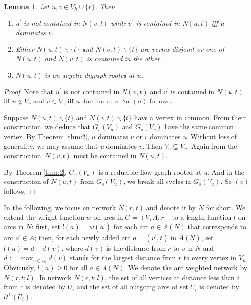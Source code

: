 \documentclass[11pt]{article}
\newtheorem{lemma}[theorem]{Lemma}
\begin{document}
\begin{lemma}
\label{lem:1}
Let $u,v\in V_h\cup\{r\}$. Then
\begin{enumerate}[label=\emph{(}\alph*\emph{)}]
  \item $u^\prime$ is not contained in $N(v,t)$ while $v^\prime$ is contained in $N(u,t)$ iff $u$ dominates $v$.
  \item Either $N(u,t)\backslash\{t\}$ and $N(v,t)\backslash\{t\}$ are vertex disjoint or one of $N(u,t)$ and $N(v,t)$ is contained in the other.
  \item $N(u,t)$ is an acyclic digraph rooted at $u$.
\end{enumerate}
\end{lemma}
\begin{proof}
Note that $u^\prime$ is not contained in $N(v,t)$ and $v^\prime$ is contained in $N(u,t)$ iff $u\not\in V_v$ and $v\in V_u$ iff $u$ dominates $v$. So $(a)$ follows.

Suppose $N(u,t)\backslash\{t\}$ and $N(v,t)\backslash\{t\}$ have a vertex in common. From their construction, we deduce that $G_s(V_u)$ and $G_s(V_v)$ have the same common vertex. By Theorem \ref{thm:2}, $u$ dominates $v$ or $v$ dominates $u$. Without loss of generality, we may assume that $u$ dominates $v$. Then $V_v\subseteq V_u$. Again from the construction, $N(v,t)$ must be contained in $N(u,t)$.

By Theorem \ref{thm:2}, $G_s(V_u)$ is a reducible flow graph rooted at $u$. And in the construction of $N(u,t)$ from $G_s(V_u)$, we break all cycles in $G_s(V_u)$. So $(c)$ follows.
\end{proof}

In the following, we focus on network $N(r,t)$ and denote it by $N$ for short. We extend the weight function $w$ on arcs in $G=(V,A;r)$ to a length function $l$ on arcs in $N$: first, set $l(a)=w(a^\prime)$ for each arc $a\in A(N)$ that corresponds to arc $a^\prime\in A$; then, for each newly added arc $a=(v^\prime,t)$ in $A(N)$, set $l(a)=d-d(v)$, where $d(v)$ is the distance from $r$ to $v$ in $N$ and $d:=\max_{v\in V_h} d(v)$ stands for the largest distance from $r$ to every vertex in $V_h$. Obviously, $l(a)\geq 0$ for all $a\in A(N)$. We denote the arc weighted network by $N(r,t;l)$. In network $N(r,t;l)$, the set of all vertices at distance less than $i$ from $r$ is denoted by $U_i$ and the set of all outgoing arcs of set $U_i$ is denoted by $\partial^+(U_i)$.
\end{document}
